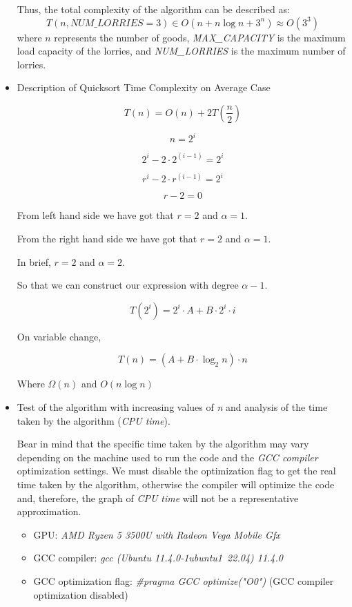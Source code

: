 \documentclass{article}
\begin{document}
\begin{multicols}{2}
\begin{itemize}
	      Thus, the total complexity of the algorithm can be described as:
	      \[
		      T(n, \textit{NUM\_LORRIES} = 3) \in O(n + n \log n + 3^n) \approx O(3^3)
	      \]
	      where \(n\) represents the number of goods, \textit{MAX\_CAPACITY} is the maximum load capacity of the lorries, and \textit{NUM\_LORRIES} is the maximum number of lorries.
\item{Description of Quicksort Time Complexity on Average Case}

\[
T(n)=O(n)+2T\left(\frac{n}{2}\right)
\]

\[
n=2^i
\]

\[
2^i-2\cdot2^{(i-1)}=2^i
\]

\[
r^i-2\cdot r^{(i-1)}=2^i
\]

\[
r-2=0
\]

From left hand side we have got that \(r=2\) and \(\alpha=1\).

From the right hand side we have got that \(r=2\) and \(\alpha=1\).

In brief, \(r=2\) and \(\alpha=2\).

So that we can construct our expression with degree \(\alpha-1\).

\[
T(2^i)=2^i \cdot A+B \cdot 2^i \cdot i
\]

On variable change,

\[
T(n)=(A+B \cdot \log_2 n)\cdot n
\]

Where \(\Omega(n)\) and \(O(n\log n)\)


	\item Test of the algorithm with increasing values of \textit{n} and analysis of the time taken by the algorithm (\textit{CPU time}).

	      Bear in mind that the specific time taken by the algorithm may vary depending on the machine used to run the code
	      and the \textit{GCC compiler} optimization settings. We must disable the optimization flag to get the real time taken by the algorithm,
	      otherwise the compiler will optimize the code and, therefore, the graph of \textit{CPU time} will not be a representative approximation.
	      \begin{itemize}
		      \item GPU: \textit{AMD Ryzen 5 3500U with Radeon Vega Mobile Gfx}
		      \item GCC compiler: \textit{gcc (Ubuntu 11.4.0-1ubuntu1~22.04) 11.4.0}
		      \item GCC optimization flag: \textit{\#pragma GCC optimize("O0")} (GCC compiler optimization disabled)
	      \end{itemize}


\end{itemize}
\end{multicols}
\end{document}
